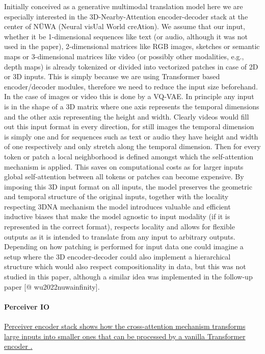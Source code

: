\documentclass[
]{krantz}
\begin{document}
Initially conceived as a generative multimodal translation model here we are especially interested in the 3D-Nearby-Attention encoder-decoder stack at the center of NÜWA (Neural visUal World creAtion). We assume that our input, whether it be 1-dimensional sequences like text (or audio, although it was not used in the paper), 2-dimensional matrices like RGB images, sketches or semantic maps or 3-dimensional matrices like video (or possibly other modalities, e.g., depth maps) is already tokenized or divided into vectorized patches in case of 2D or 3D inputs. This is simply because we are using Transformer based encoder/decoder modules, therefore we need to reduce the input size beforehand. In the case of images or video this is done by a VQ-VAE. In principle any input is in the shape of a 3D matrix where one axis represents the temporal dimensions and the other axis representing the height and width. Clearly videos would fill out this input format in every direction, for still images the temporal dimension is simply one and for sequences such as text or audio they have height and width of one respectively and only stretch along the temporal dimension. Then for every token or patch a local neighborhood is defined amongst which the self-attention mechanism is applied. This saves on computational costs as for larger inputs global self-attention between all tokens or patches can become expensive. By imposing this 3D input format on all inputs, the model preserves the geometric and temporal structure of the original inputs, together with the locality respecting 3DNA mechanism the model introduces valuable and efficient inductive biases that make the model agnostic to input modality (if it is represented in the correct format), respects locality and allows for flexible outputs as it is intended to translate from any input to arbitrary outputs. Depending on how patching is performed for input data one could imagine a setup where the 3D encoder-decoder could also implement a hierarchical structure which would also respect compositionality in data\citep{kahatapitiya2021swat}, but this was not studied in this paper, although a similar idea was implemented in the follow-up paper \citep{wu2021nwa}{[}@ wu2022nuwainfinity{]}.

\hypertarget{perceiver-io}{%
\paragraph{Perceiver IO}\label{perceiver-io}}

\href{figures/03-01/perceiver-io.png}{Perceiver encoder stack shows how the cross-attention mechanism transforms large inputs into smaller ones that can be processed by a vanilla Transformer encoder \citep{jaegle2021perceiver}.}
\end{document}
